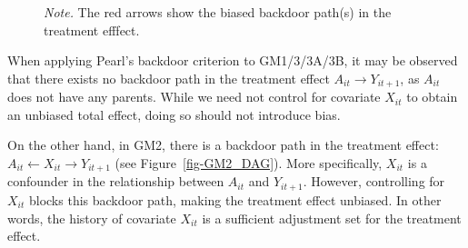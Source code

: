 \documentclass[
  12pt,
  a4paper,
]{article}
\begin{document}
\begin{figure}[H]
\begin{minipage}{0.50\linewidth}
{}

\end{minipage}%
\newline
\begin{minipage}{0.50\linewidth}



\end{minipage}%
%
\begin{minipage}{0.50\linewidth}
\emph{Note.} The red arrows show the biased backdoor path(s) in the
treatment efffect.\end{minipage}%

\end{figure}%

When applying Pearl's backdoor criterion to GM1/3/3A/3B, it may be
observed that there exists no backdoor path in the treatment effect
\(A_{it} \to Y_{it+1}\), as \(A_{it}\) does not have any parents. While
we need not control for covariate \(X_{it}\) to obtain an unbiased total
effect, doing so should not introduce bias.

On the other hand, in GM2, there is a backdoor path in the treatment
effect: \(A_{it} \leftarrow X_{it} \rightarrow Y_{it+1}\) (see
Figure~\ref{fig-GM2_DAG}). More specifically, \(X_{it}\) is a confounder
in the relationship between \(A_{it}\) and \(Y_{it+1}\). However,
controlling for \(X_{it}\) blocks this backdoor path, making the
treatment effect unbiased. In other words, the history of covariate
\(X_{it}\) is a sufficient adjustment set for the treatment effect.
\end{document}
